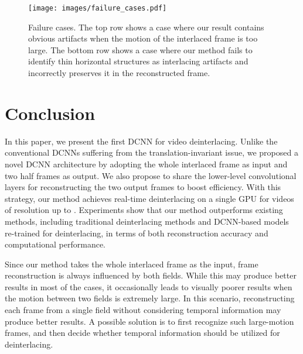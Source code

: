 \documentclass[acmtog]{acmart}
\begin{document}
\fi
\begin{figure}[!tp]
	\centering
	\texttt{[image: images/failure\_cases.pdf]}\\
	\caption{Failure cases. The top row shows a case where our result contains obvious artifacts when the motion of the interlaced frame is too large. The bottom row shows a case where our method fails to identify thin horizontal structures as interlacing artifacts and incorrectly preserves it in the reconstructed frame.}\label{fig:failure_cases}
\end{figure} \section{Conclusion}
In this paper, we present the first DCNN for video deinterlacing. Unlike
the conventional DCNNs suffering from the translation-invariant issue, we
proposed a novel DCNN architecture by adopting the whole interlaced frame as
input and two half frames as output. We also propose to share the lower-level
convolutional layers for reconstructing the two output frames to boost  
efficiency. With this strategy, our method achieves real-time deinterlacing
on a single GPU for videos of resolution up to .
Experiments show that our method outperforms existing methods,
including traditional deinterlacing methods and DCNN-based models re-trained for
deinterlacing, in terms of both reconstruction accuracy and computational
performance.

Since our method takes the whole interlaced frame as the input, frame
reconstruction is always influenced by both fields. While this may produce
better results in most of the cases, it occasionally leads to visually poorer
results when the
motion between two fields is extremely large. In this scenario, reconstructing
each frame from a single field without considering temporal information may
produce better results. A possible solution is to first recognize such large-motion
frames, and then decide whether temporal information should be utilized for 
deinterlacing.

 


\end{document}
